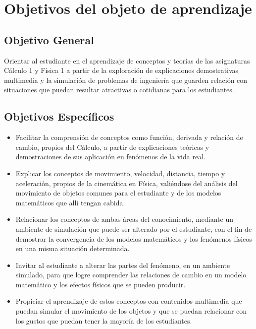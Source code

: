 \documentclass[twoside,letterpaper,11pt]{report}
\begin{document}


\section{Objetivos del objeto de aprendizaje} %
\label{sec:objetivos_del_objeto_de_aprendizaje}

\subsection{Objetivo General} %
\label{sub:objetivo_general}

Orientar al estudiante en el aprendizaje de conceptos y teorías de las asignaturas Cálculo 1 y Física 1 a partir de la exploración de explicaciones demostrativas multimedia y la simulación de problemas de ingeniería que guarden relación con situaciones que puedan resultar atractivas o cotidianas para los estudiantes.


\subsection{ Objetivos Específicos} %
\label{sub:_objetivos_espec_ficos}

\begin{itemize}
	\item Facilitar la comprensión de conceptos como función, derivada y relación de cambio, propios del Cálculo, a partir de explicaciones teóricas y demostraciones de sus aplicación en fenómenos de la vida real.

	\item Explicar los conceptos de movimiento, velocidad, distancia, tiempo y aceleración, propios de la cinemática en Física, valiéndose del análisis del movimiento de objetos comunes para el estudiante y de los modelos matemáticos que allí tengan cabida.

	\item Relacionar los conceptos de ambas áreas del conocimiento, mediante un ambiente de simulación que puede ser alterado por el estudiante, con el fin de demostrar la convergencia de los modelos matemáticos y los fenómenos físicos en una misma situación determinada.

	\item Invitar al estudiante a alterar las partes del fenómeno, en un ambiente simulado, para que logre comprender las relaciones de cambio en un modelo matemático y los efectos físicos que se pueden producir.

	\item Propiciar el aprendizaje de estos conceptos con contenidos multimedia que puedan simular el movimiento de los objetos y que se puedan relacionar con los gustos que puedan tener la mayoría de los estudiantes.

\end{itemize}
\end{document}
